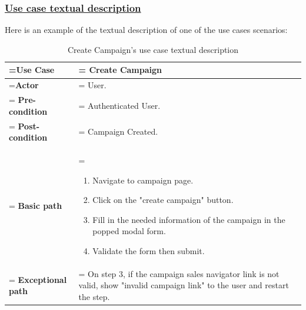 \subsubsection{\underline{Use case textual description}}
Here is an example of the textual description of one of the use cases scenarios:
\begin{table}[H]
    \renewcommand{\arraystretch}{1.5}%
    \caption{Create Campaign's use case textual description}
    \centering
    \medskip
    \begin{tabularx}{1\textwidth} {
            | >{\hsize=0.5\hsize\linewidth=\hsize\centering\arraybackslash}X
            | >{\hsize=1.5\hsize\linewidth=\hsize\justifying\arraybackslash}X |}
        \hline
        \textbf {Use Case}         & \noindent Create Campaign                                                                                                              \\
        \hline
        \textbf {Actor}            & \noindent User.                                                                                                                        \\
        \hline
        \textbf {Pre-condition}    & \noindent Authenticated User.                                                                                                          \\
        \hline
        \textbf {Post-condition}   & \noindent Campaign Created.                                                                                                            \\
        \hline
        \textbf {Basic path}       & \noindent    \begin{enumerate}
            \item Navigate to campaign page.
            \item Click on the "create campaign" button.
            \item Fill in the needed information of the campaign in the popped modal form.
            \item Validate the form then submit.
        \end{enumerate}                                                                                                 \\
        \hline
        \textbf {Exceptional path} & \noindent On step 3, if the campaign sales navigator link is not valid, show "invalid campaign link" to the user and restart the step. \\
        \hline
    \end{tabularx}
\end{table}

